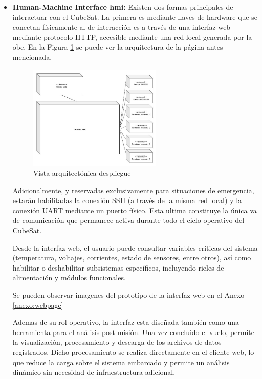 \begin{itemize}
      \item \textbf{Human-Machine Interface \acrshort{hmi}:} Existen dos formas principales de interactuar con
        el CubeSat. La primera es mediante llaves de hardware que se conectan físicamente al
        de interacción es a través de una interfaz web mediante protocolo HTTP, accesible mediante una
        red local generada por la \acrshort{obc}. En la Figura \ref{fig:hmi-arq} se puede ver la arquitectura
        de la página antes mencionada.

        \begin{figure}[H]
          \centering
          \includegraphics[width=0.6\textwidth]{image/hmi/arquitectura.jpeg}
          \caption{Vista arquitectónica despliegue}
          \label{fig:hmi-arq}
        \end{figure}

        Adicionalmente, y reservadas exclusivamente para situaciones de emergencia, estarán
        habilitadas la conexión SSH (a través de la misma red local) y la conexión UART
        mediante un puerto físico. Esta ultima constituye la única va de comunicación que
        permanece activa durante todo el ciclo operativo del CubeSat.

        Desde la interfaz web, el usuario puede consultar variables criticas del sistema (temperatura, voltajes,
        corrientes, estado de sensores, entre otros), así como habilitar o
        deshabilitar subsistemas específicos, incluyendo rieles de alimentación y módulos funcionales.

        Se pueden observar imagenes del prototípo de la interfaz web en el Anexo \ref{anexo:webpage}

        Ademas de su rol operativo, la interfaz esta diseñada también como una herramienta
        para el análisis post-misión. Una vez concluido el vuelo, permite la visualización, procesamiento
        y descarga de los archivos de datos registrados. Dicho procesamiento se realiza
        directamente en el cliente web, lo que reduce la carga sobre el sistema embarcado y
        permite un análisis dinámico sin necesidad de infraestructura adicional.


\end{itemize}
